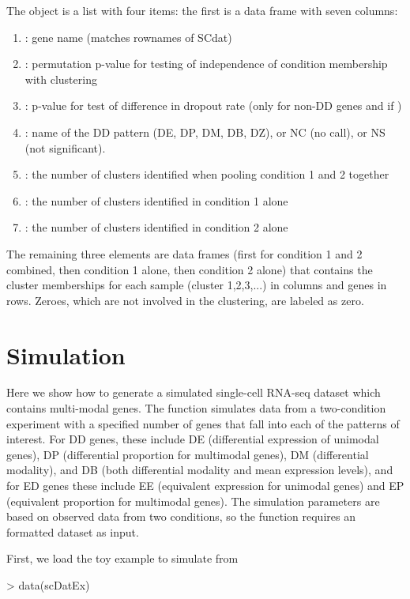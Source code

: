 \documentclass{article}
\begin{document}
The  object is a list with four items: the first is a data frame with seven columns: 
\begin{enumerate}
  \item {}: gene name (matches rownames of SCdat)
  \item {}: permutation p-value for testing of independence of condition membership with clustering
  \item {}: p-value for test of difference in dropout rate (only for non-DD genes and if )
  \item {}: name of the DD pattern (DE, DP, DM, DB, DZ), or NC (no call), or NS (not significant).  
  \item {}: the number of clusters identified when pooling condition 1 and 2 together
  \item {}: the number of clusters identified in condition 1 alone
  \item {}: the number of clusters identified in condition 2 alone
\end{enumerate}
  The remaining three elements are data frames (first for condition 1 and 2 combined, then condition 1 alone, then condition 2 alone) that contains the cluster memberships for each sample (cluster 1,2,3,...) in columns and genes in rows.  Zeroes, which are not involved in the clustering, are labeled as zero.  

\section{Simulation}

Here we show how to generate a simulated single-cell RNA-seq dataset which contains multi-modal genes.  The  function simulates data from a two-condition experiment with a specified number of genes that fall into each of the patterns of interest.  For DD genes, these include DE (differential expression of unimodal genes), DP (differential proportion for multimodal genes), DM (differential modality), and DB (both differential modality and mean expression levels), and for ED genes these include EE (equivalent expression for unimodal genes) and EP (equivalent proportion for multimodal genes).  The simulation parameters are based on observed data from two conditions, so the function requires an  formatted dataset as input.

First, we load the toy example  to simulate from
\begin{Schunk}
\begin{Sinput}
> data(scDatEx)
\end{Sinput}
\end{Schunk}
\end{document}
